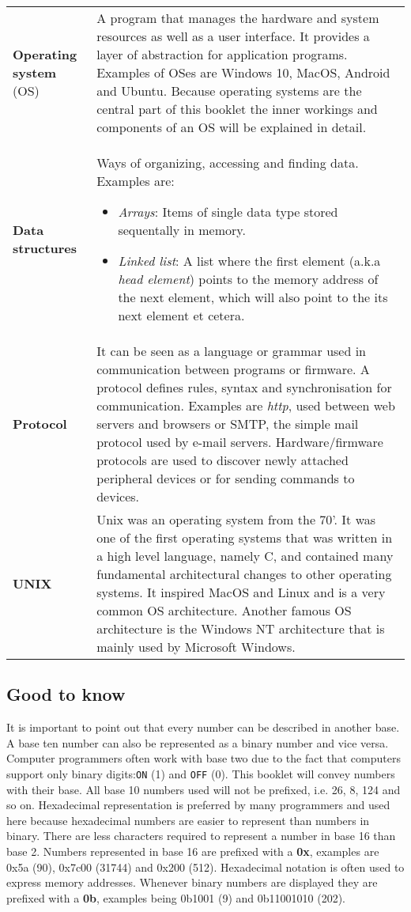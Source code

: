 \begin{tabular}{ | m{30mm} | m{120mm} |}
\textbf{Operating system} (OS) & A program that manages the hardware and system resources as well as a user interface. It provides a layer of abstraction for application programs. Examples of OSes are Windows 10, MacOS, Android and Ubuntu. Because operating systems are the central part of this booklet the inner workings and components of an OS will be explained in detail. \\
\textbf{Data structures} & Ways of organizing, accessing and finding data. Examples are: \begin{itemize}
\item \textit{Arrays}: Items of single data type stored sequentally in memory.
\item \textit{Linked list}: A list where the first element (a.k.a \textit{head element}) points to the memory address of the next element, which will also point to the its next element et cetera.
\end{itemize} \\
\textbf{Protocol} & It can be seen as a language or grammar used in communication between programs or firmware. A protocol defines rules, syntax and synchronisation for communication. Examples are \textit{http}, used between web servers and browsers or SMTP, the simple mail protocol used by e-mail servers. Hardware/firmware protocols are used to discover newly attached peripheral devices or for sending commands to devices. \\
\textbf{UNIX} & Unix was an operating system from the 70'. It was one of the first operating systems that was written in a high level language, namely C, and contained many fundamental architectural changes to other operating systems. It inspired MacOS and Linux and is a very common OS architecture. Another famous OS architecture is the Windows NT architecture that is mainly used by Microsoft Windows.
\end{tabular}


\subsection{Good to know}

It is important to point out that every number can be described in another base. A base ten number can also be represented
as a binary number and vice versa. Computer programmers often work with base two due to the fact that computers support only 
binary digits:\texttt{ON} (1) and \texttt{OFF} (0).
This booklet will convey numbers with their base. All base 10 numbers used will not be prefixed, i.e. 26, 8, 124 and so on.
Hexadecimal representation is preferred by many programmers and used here because hexadecimal numbers are easier to represent than numbers in binary. There are less characters required to represent a number in base 16 than base 2. Numbers represented in
base 16 are prefixed with a \textbf{0x}, examples are 0x5a (90), 0x7c00 (31744) and 0x200 (512). Hexadecimal notation is often used to
express memory addresses. Whenever binary numbers are displayed they are prefixed with a \textbf{0b}, examples being 0b1001 (9)
and 0b11001010 (202).

